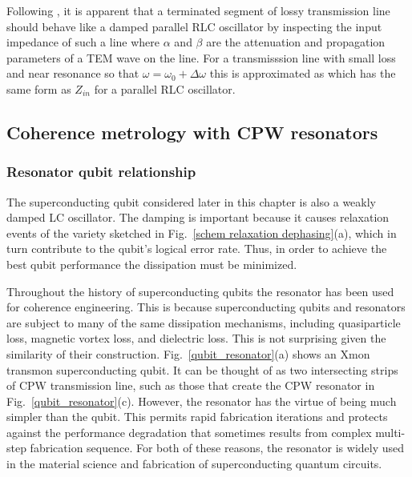 Following  \cite{Pozar}, it is apparent that a terminated segment of lossy transmission line should behave like a damped parallel RLC oscillator by inspecting the input impedance of such a line
where $\alpha$ and $\beta$ are the attenuation and propagation parameters of a TEM wave on the line.
For a transmisssion line with small loss and near resonance so that $\omega = \omega_0 + \Delta \omega$ this is approximated as
which has the same form as $Z_{in}$ for a parallel RLC oscillator.

\subsection{Coherence metrology with CPW resonators}

\subsubsection{Resonator qubit relationship}

The superconducting qubit considered later in this chapter is also a weakly damped LC oscillator.
The damping is important because it causes relaxation events of the variety sketched in Fig.~\ref{schem relaxation dephasing}(a),
which in turn contribute to the qubit's logical error rate.
Thus, in order to achieve the best qubit performance the dissipation must be minimized.

Throughout the history of superconducting qubits the resonator has been used for coherence engineering.
This is because superconducting qubits and resonators are subject to many of the same dissipation mechanisms,
including quasiparticle loss, magnetic vortex loss, and dielectric loss.
This is not surprising given the similarity of their construction.
Fig.~\ref{qubit_resonator}(a) shows an Xmon transmon superconducting qubit.
It can be thought of as two intersecting strips of CPW transmission line,
such as those that create the CPW resonator in Fig.~\ref{qubit_resonator}(c).
However, the resonator has the virtue of being much simpler than the qubit.
This permits rapid fabrication iterations and protects against the performance degradation that sometimes results from complex multi-step fabrication sequence.
For both of these reasons, the resonator is widely used in the material science and fabrication of superconducting quantum circuits.

